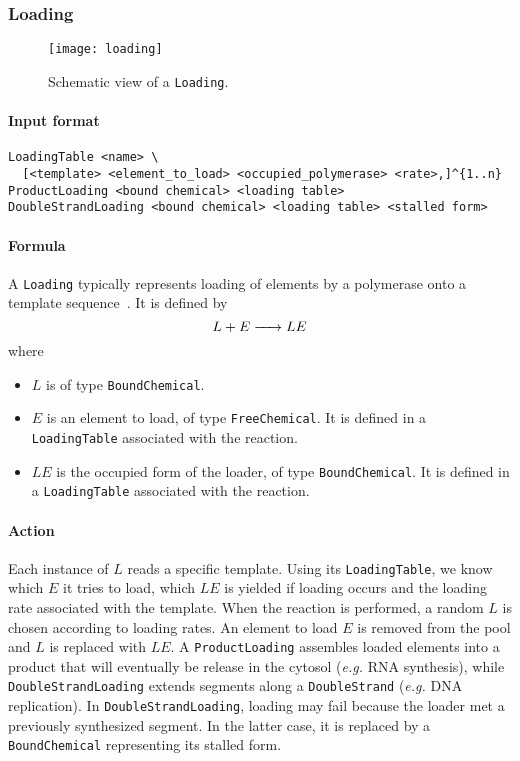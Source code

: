 \subsubsection{Loading}

\begin{figure}[!h]
  \centering
  \texttt{[image: loading]}
  \caption{Schematic view of a \texttt{Loading}.}
  \label{fig:loading}
\end{figure}

\paragraph{Input format}
\begin{verbatim}
LoadingTable <name> \
  [<template> <element_to_load> <occupied_polymerase> <rate>,]^{1..n}
ProductLoading <bound chemical> <loading table>
DoubleStrandLoading <bound chemical> <loading table> <stalled form>
\end{verbatim}

\paragraph{Formula} A \texttt{Loading} typically represents loading of elements by a polymerase onto a template sequence~. It is defined by
\[
\reactionIrr{L + E}{LE}{}{}
\]
where
\begin{itemize}
	\item $L$ is of type \texttt{BoundChemical}.
	\item $E$ is an element to load, of type \texttt{FreeChemical}. It is defined in a \texttt{LoadingTable} associated with the reaction.
	\item $LE$ is the occupied form of the loader, of type \texttt{BoundChemical}. It is defined in a \texttt{LoadingTable} associated with the reaction.
\end{itemize}

\paragraph{Action} Each instance of $L$ reads a specific template. Using its \texttt{LoadingTable}, we know which $E$ it tries to load, which $LE$ is yielded if loading occurs and the loading rate associated with the template. When the reaction is performed, a random $L$ is chosen according to loading rates. An element to load $E$ is removed from the pool and $L$ is replaced with $LE$. A \texttt{ProductLoading} assembles loaded elements into a product that will eventually be release in the cytosol (\textit{e.g.} RNA synthesis), while \texttt{DoubleStrandLoading} extends segments along a \texttt{DoubleStrand} (\textit{e.g.} DNA replication). In \texttt{DoubleStrandLoading}, loading may fail because the loader met a previously synthesized segment. In the latter case, it is replaced by a \texttt{BoundChemical} representing its stalled form.

